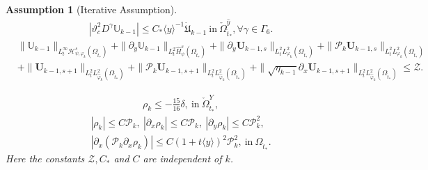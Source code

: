 \documentclass{amsart}
\numberwithin{equation}{section}
\newtheorem{assumption}{Assumption}[section]
\newcommand\y{{{\langle y \rangle}}}
\begin{document}
\begin{assumption}[Iterative Assumption]
\begin{align}\label{ITA7}
|\vartheta_{c}^{2}D^{\gamma}\mathbb{U}_{k-1}|\leq C_{*}\y^{-1}\dot{\mathfrak{U}}_{k-1}~\text{in}~\check{\Omega}_{\hat{t}_{*}}^{\hat{y}}, \forall \gamma\in\Gamma_{6}.
\end{align}
\begin{align}\label{ITA8}
& \|\mathbb{U}_{k-1}\|_{L_{t}^{\infty}\mathcal{H}_{\psi,\varphi_{k}}^{s}(\Omega_{\hat{t}_{*}})}
 +\|\partial_{y}\mathbb{U}_{k-1}\|_{L_{t}^{2}\hat{H}_{\psi}^{s}(\Omega_{\hat{t}_{*}})}
 +\|\partial_{y}\mathbf{U}_{k-1,s}\|_{L_{t}^{2}L_{\varphi_{k}}^{2}(\Omega_{\hat{t}_{*}})}
 +\|\mathcal{P}_{k}\mathbf{U}_{k-1,s}\|_{L_{t}^{2}L_{\varphi_{k}}^{2}(\Omega_{\hat{t}_{*}})}\\
&+\|\mathbf{U}_{k-1,s+1}\|_{L_{t}^{2}L_{\hat{\varphi}_{k}}^{2}(\Omega_{\hat{t}_{*}})}
 +\|\mathcal{P}_{k}\mathbf{U}_{k-1,s+1}\|_{L_{t}^{2}L_{\hat{\varphi}_{k}}^{2}(\Omega_{\hat{t}_{*}})}
 +\|\sqrt{\eta_{k-1}}\partial_{x}\mathbf{U}_{k-1,s+1}\|_{L_{t}^{2}L_{\hat{\varphi}_{k}}^{2}(\Omega_{\hat{t}_{*}})}
\leq \mathcal{Z}.\nonumber
\end{align}

\begin{align}\label{ITA9}
\rho_{k}\leq -\frac{15}{16}\delta,~\text{in}~\check{\Omega}_{\hat{t}_{*}}^{Y},
\end{align}
\begin{align}\label{ITA10}
|\rho_{k}|\leq C\mathcal{P}_{k},~|\partial_{x}\rho_{k}|\leq C\mathcal{P}_{k},~
|\partial_{y}\rho_{k}|\leq C\mathcal{P}_{k}^{2},~\\
\left|\partial_{x}(\mathcal{P}_{k}\partial_{x}\rho_{k})\right|\leq C(1+t\y)^{2}\mathcal{P}_{k}^{2},~\text{in}~\Omega_{\hat{t}_{*}}.\nonumber
\end{align}
Here the constants $\mathcal{Z}, C_{*}$ and $C$ are independent of $k$.
\end{assumption}
\end{document}
